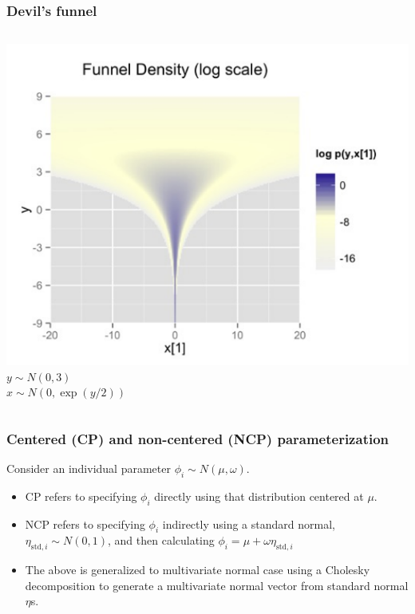 \documentclass{beamer}
\begin{document}
\begin{frame}
  \frametitle{Devil's funnel}

\begin{columns}
  \includegraphics[width=\textwidth]{graphics/devils-funnel.pdf}
  $y \sim N(0, 3)$\\
  $x \sim N(0, \exp(y/2))$
\end{columns}

\end{frame}

\begin{frame}
  \frametitle{Centered (CP) and non-centered (NCP) parameterization}
  
Consider an individual parameter $\phi_i \sim N(\mu, \omega)$.
\begin{itemize}
\item CP refers to specifying $\phi_i$ directly using that distribution
  centered at $\mu$.
\item NCP refers to specifying $\phi_i$ indirectly using a standard
  normal, $\eta_{\text{std},i} \sim N(0, 1)$, and
  then calculating $\phi_i = \mu + \omega \eta_{\text{std},i}$
\item The above is generalized  to multivariate normal case using a
  Cholesky decomposition to generate a multivariate normal vector from
  standard normal $\eta$s.
\end{itemize}

\end{frame}
\end{document}
